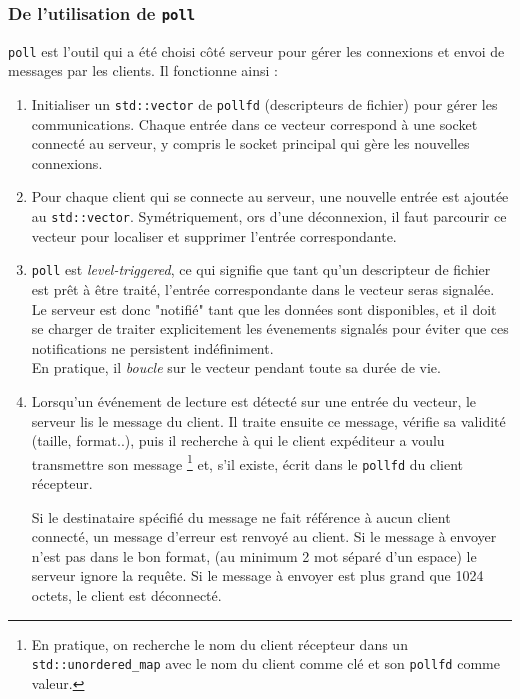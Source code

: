 \documentclass{article}
\begin{document}
\subsubsection{De l'utilisation de \texttt{poll}}
\texttt{poll} \cite{poll} est l'outil qui a été choisi côté serveur pour gérer les connexions et envoi de messages par les clients. Il fonctionne ainsi \cite{poll} :
\begin{enumerate}
    \item Initialiser un \texttt{std::vector} de \texttt{pollfd} (descripteurs de fichier) pour gérer les communications. Chaque entrée dans ce vecteur correspond à une socket connecté au serveur, y compris le socket principal qui gère les nouvelles connexions.
    \item Pour chaque client qui se connecte au serveur, une nouvelle entrée  est ajoutée au \texttt{std::vector}. Symétriquement, ors d'une déconnexion, il faut parcourir ce vecteur pour localiser et supprimer l'entrée correspondante.
    \item \texttt{poll} est \textit{level-triggered}, ce qui signifie que tant qu'un descripteur de fichier est prêt à être traité, l'entrée correspondante dans le vecteur seras signalée. Le serveur est donc "notifié" tant que les données sont disponibles, \cite{LevelEdgeTrigger} \cite{PollTrigger} et il doit se charger de traiter explicitement les évenements signalés pour éviter que ces notifications ne persistent indéfiniment.\\ En pratique, il \textit{boucle} sur le vecteur pendant toute sa durée de vie.
    \item Lorsqu’un événement de lecture est détecté sur une entrée du vecteur, le serveur lis le message du client. Il traite ensuite ce message, vérifie sa validité (taille, format..), puis il recherche à qui le client expéditeur a voulu transmettre son message \footnote{En pratique, on recherche le nom du client récepteur dans un \texttt{std::unordered\_map} avec le nom du client comme clé et son \texttt{pollfd} comme valeur.} et, s'il existe, écrit dans le \texttt{pollfd} du client récepteur.


    Si le destinataire spécifié du message ne fait référence à aucun client connecté, un message d'erreur est renvoyé au client.
    Si le message à envoyer n'est pas dans le bon format, (au minimum 2 mot séparé d'un espace) le serveur ignore la requête.
    Si le message à envoyer est plus grand que 1024 octets, le client est déconnecté.
\end{enumerate}
\end{document}
